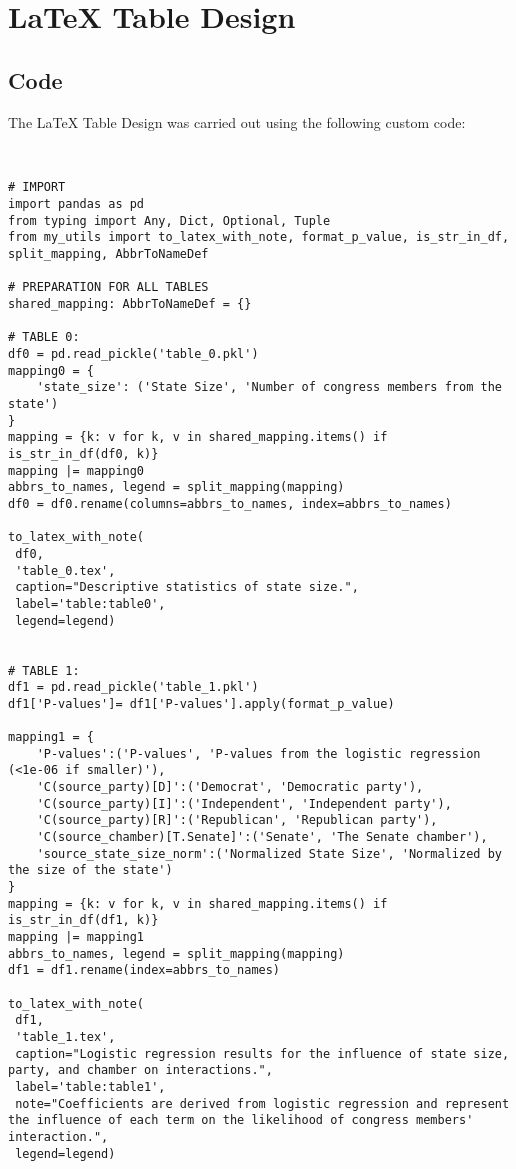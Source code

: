 \documentclass[11pt]{article}
\begin{document}
\section{LaTeX Table Design}
\subsection{{Code}}
The LaTeX Table Design was carried out using the following custom code:

\begin{verbatim}


# IMPORT
import pandas as pd
from typing import Any, Dict, Optional, Tuple
from my_utils import to_latex_with_note, format_p_value, is_str_in_df, split_mapping, AbbrToNameDef

# PREPARATION FOR ALL TABLES
shared_mapping: AbbrToNameDef = {}

# TABLE 0:
df0 = pd.read_pickle('table_0.pkl')
mapping0 = {
    'state_size': ('State Size', 'Number of congress members from the state')
}
mapping = {k: v for k, v in shared_mapping.items() if is_str_in_df(df0, k)}
mapping |= mapping0
abbrs_to_names, legend = split_mapping(mapping)
df0 = df0.rename(columns=abbrs_to_names, index=abbrs_to_names)

to_latex_with_note(
 df0, 
 'table_0.tex', 
 caption="Descriptive statistics of state size.", 
 label='table:table0',
 legend=legend)


# TABLE 1:
df1 = pd.read_pickle('table_1.pkl')
df1['P-values']= df1['P-values'].apply(format_p_value)

mapping1 = {
    'P-values':('P-values', 'P-values from the logistic regression (<1e-06 if smaller)'),
    'C(source_party)[D]':('Democrat', 'Democratic party'),
    'C(source_party)[I]':('Independent', 'Independent party'),
    'C(source_party)[R]':('Republican', 'Republican party'),
    'C(source_chamber)[T.Senate]':('Senate', 'The Senate chamber'),
    'source_state_size_norm':('Normalized State Size', 'Normalized by the size of the state')
}
mapping = {k: v for k, v in shared_mapping.items() if is_str_in_df(df1, k)} 
mapping |= mapping1
abbrs_to_names, legend = split_mapping(mapping)
df1 = df1.rename(index=abbrs_to_names)

to_latex_with_note(
 df1, 
 'table_1.tex', 
 caption="Logistic regression results for the influence of state size, party, and chamber on interactions.", 
 label='table:table1',
 note="Coefficients are derived from logistic regression and represent the influence of each term on the likelihood of congress members' interaction.", 
 legend=legend)


\end{verbatim}
\end{document}
